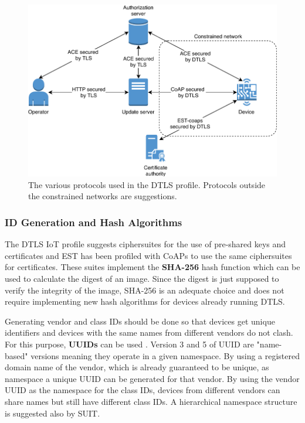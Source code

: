 \documentclass[0-thesis.tex]{subfiles}
\begin{document}
\begin{figure}
    \caption{The various protocols used in the DTLS profile. Protocols outside the constrained networks are suggestions.}
    \label{fig:dtls-profile}
    \includegraphics{images/dtls-profile.pdf}
\end{figure}

\subsubsection{ID Generation and Hash Algorithms}
\label{sssec:hash-id-algorithm}
The DTLS IoT profile suggests ciphersuites for the use of pre-shared keys and certificates
and EST has been profiled with CoAPs to use the same ciphersuites for certificates. These
suites implement the \textbf{SHA-256} hash function which can be used to calculate the
digest of an image. Since the digest is just supposed to verify the integrity of the
image, SHA-256 is an adequate choice and does not require implementing new hash algorithms
for devices already running DTLS.

Generating vendor and class IDs should be done so that devices get unique identifiers and
devices with the same names from different vendors do not clash. For this purpose,
\textbf{UUIDs} can be used \parencite{rfc4122}. Version 3 and 5 of UUID are "name-based"
versions meaning they operate in a given namespace. By using a registered domain name of
the vendor, which is already guaranteed to be unique, as namespace a unique UUID can be
generated for that vendor. By using the vendor UUID as the namespace for the class IDs,
devices from different vendors can share names but still have different class IDs. A
hierarchical namespace structure is suggested also by SUIT.
\end{document}

